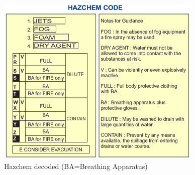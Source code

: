 \documentclass{report}
\begin{document}
	\begin{figure}[h]
		\centering
		\includegraphics[width=0.5\linewidth]{hazchem}
		\caption{Hazchem decoded (BA=Breathing Apparatus)}
		\label{hazchem}
	\end{figure}
\end{document}
